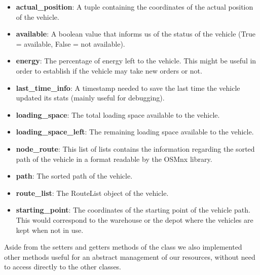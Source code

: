 \documentclass[titlepage]{article}
\begin{document}
\begin{itemize}
    \item \textbf{actual\_position}: A tuple containing the coordinates of the actual position of the vehicle.
    \item \textbf{available}: A boolean value that informs us of the status of the vehicle (True = available, False = not available).
    \item \textbf{energy}: The percentage of energy left to the vehicle. This might be useful in order to establish if the vehicle may take new orders or not.
    \item \textbf{last\_time\_info}: A timestamp needed to save the last time the vehicle updated its stats (mainly useful for debugging).
    \item \textbf{loading\_space}: The total loading space available to the vehicle.
    \item \textbf{loading\_space\_left}: The remaining loading space available to the vehicle.
    \item \textbf{node\_route}: This list of lists contains the information regarding the sorted path of the vehicle in a format readable by the OSMnx library.
    \item \textbf{path}: The sorted path of the vehicle.
    \item \textbf{route\_list}: The RouteList object of the vehicle.
    \item \textbf{starting\_point}: The coordinates of the starting point of the vehicle path. This would correspond to the warehouse or the depot where the vehicles are kept when not in use.
\end{itemize}

Aside from the setters and getters methods of the class we also implemented other methods useful for an abstract management of our resources, without need to access directly to the other classes.
\end{document}
